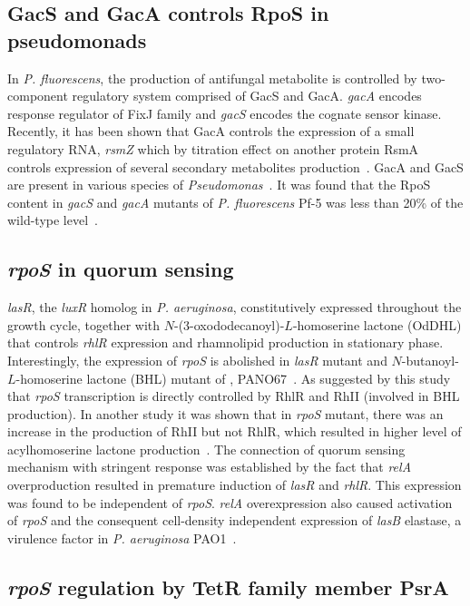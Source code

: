 \subsection{GacS and GacA controls RpoS in pseudomonads}

In \emph{P. fluorescens},  the production of antifungal metabolite
is controlled by two-component regulatory system comprised of GacS
and GacA. \emph{gacA} encodes response regulator of FixJ family
and \emph{gacS} encodes the cognate sensor kinase. Recently, it
has been shown that GacA controls the expression of a small
regulatory RNA, \emph{rsmZ} which by titration effect on another
protein RsmA controls expression of several secondary metabolites
production~\citep{Heeb2002}. GacA and GacS are present in various
species of \emph{Pseudomonas}~\citep{Kitten1998}. It was found
that the RpoS content in \emph{gacS} and \emph{gacA} mutants of
\emph{P. fluorescens} Pf-5 was less than 20\% of the wild-type
level~\citep{Whistler1998}.

\subsection{\emph{rpoS} in quorum sensing}

\emph{lasR}, the \emph{luxR} homolog in \emph{P. aeruginosa},
constitutively expressed throughout the growth cycle, together
with $N$-(3-oxododecanoyl)-$L$-homoserine lactone (OdDHL) that
controls \emph{rhlR} expression and rhamnolipid production in
stationary phase. Interestingly, the expression of \emph{rpoS} is
abolished in \emph{lasR} mutant and $N$-butanoyl-$L$-homoserine
lactone (BHL) mutant of , PANO67~\citep{Latifi1996}. As
suggested by this study that \emph{rpoS} transcription is directly
controlled by RhlR and RhII (involved in BHL production). In
another study it was shown that in \emph{rpoS} mutant, there was
an increase in the production of RhII but not RhlR, which resulted
in higher level of acylhomoserine lactone
production~\citep{Whiteley2000}. The connection of quorum sensing
mechanism with stringent response was established by the fact that
\emph{relA} overproduction resulted in premature induction of
\emph{lasR} and \emph{rhlR}. This expression was found to be
independent of \emph{rpoS}. \emph{relA} overexpression also caused
activation of \emph{rpoS} and the consequent cell-density
independent expression of \emph{lasB} elastase, a virulence factor
in \emph{P. aeruginosa} PAO1~\citep{Delden2001}.

\subsection{\emph{rpoS} regulation by TetR family member PsrA}
\label{chap1:psra}

